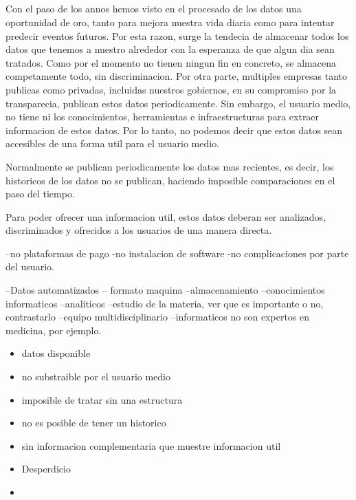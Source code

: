 \subsection*{}
Con el paso de los annos hemos visto en el procesado de los datos una oportunidad de oro, tanto para mejora nuestra vida diaria como para intentar predecir
eventos futuros. Por esta razon, surge la tendecia de almacenar todos los datos que tenemos a nuestro alrededor con la esperanza de que algun dia sean tratados.
Como por el momento no tienen ningun fin en concreto, se almacena competamente todo, sin discriminacion.
Por otra parte, multiples empresas tanto publicas como privadas, incluidas nuestros gobiernos, en su compromiso por la transparecia, publican estos datos periodicamente.
Sin embargo, el usuario medio, no tiene ni los conocimientos, herramientas e infraestructuras para extraer informacion de estos datos.
Por lo tanto, no podemos decir que estos datos sean accesibles de una forma util para el usuario medio.

Normalmente se publican periodicamente los datos mas recientes, es decir, los historicos de los datos no se publican, haciendo imposible comparaciones
en el paso del tiempo.

Para poder ofrecer una informacion util, estos datos deberan ser analizados, discriminados y ofrecidos a los usuarios de una manera directa.

--no plataformas de pago
-no instalacion de software
-no complicaciones por parte del usuario.

--Datos automatizados -- formato maquina
--almacenamiento
--conocimientos informaticos
--analiticos
--estudio de la materia, ver que es importante o no, contrastarlo
--equipo multidisciplinario
--informaticos no son expertos en medicina, por ejemplo.
\begin{itemize}

    \item datos disponible
    \item no substraible por el usuario medio
    \item imposible de tratar sin una estructura
    \item no es posible de tener un historico
    \item sin informacion complementaria que muestre informacion util
    \item Desperdicio
    \item \end{itemize}
    